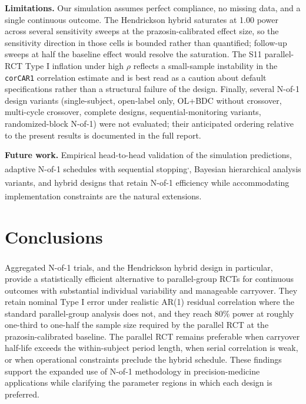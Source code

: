 \documentclass[
  11pt,
]{article}
\begin{document}
\textbf{Limitations.} Our simulation assumes perfect compliance, no
missing data, and a single continuous outcome. The Hendrickson
hybrid saturates at 1.00 power across several sensitivity
sweeps at the prazosin-calibrated effect size, so the sensitivity
direction in those cells is bounded rather than quantified;
follow-up sweeps at half the baseline effect would resolve the
saturation. The S11 parallel-RCT Type I inflation under high
\(\rho\) reflects a small-sample instability in the \texttt{corCAR1}
correlation estimate and is best read as a caution about default
specifications rather than a structural failure of the design.
Finally, several N-of-1 design variants (single-subject,
open-label only, OL+BDC without crossover, multi-cycle
crossover, complete designs, sequential-monitoring variants,
randomized-block N-of-1) were not evaluated; their anticipated
ordering relative to the present results is documented in the
full report.

\textbf{Future work.} Empirical head-to-head validation of the
simulation predictions, adaptive N-of-1 schedules with
sequential stopping\textsuperscript{,}, Bayesian hierarchical analysis
variants\textsuperscript{}, and hybrid designs
that retain N-of-1 efficiency while accommodating
implementation constraints\textsuperscript{} are
the natural extensions.

\section{Conclusions}\label{conclusions}

Aggregated N-of-1 trials, and the Hendrickson\textsuperscript{} hybrid design in particular,
provide a statistically efficient alternative to parallel-group
RCTs for continuous outcomes with substantial individual
variability and manageable carryover. They retain nominal Type I
error under realistic AR(1) residual correlation where the
standard parallel-group analysis does not, and they reach 80\%
power at roughly one-third to one-half the sample size required
by the parallel RCT at the prazosin-calibrated baseline. The
parallel RCT remains preferable when carryover half-life
exceeds the within-subject period length, when serial
correlation is weak, or when operational constraints preclude
the hybrid schedule. These findings support the expanded use of
N-of-1 methodology in precision-medicine applications while
clarifying the parameter regions in which each design is
preferred.
\end{document}
